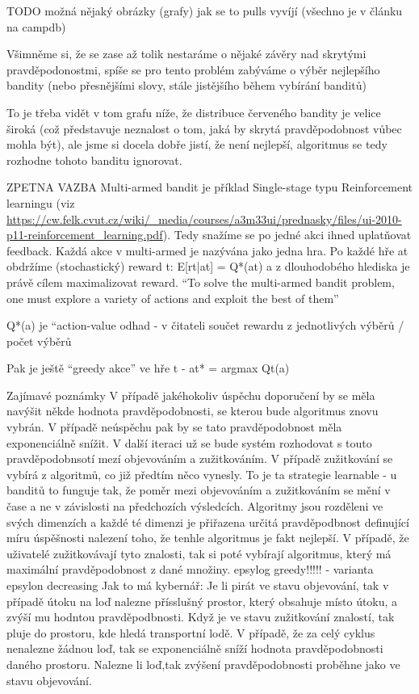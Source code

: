 \documentclass[thesis=M,czech]{FITthesis}[2014/05/07]
\begin{document}
TODO možná nějaký obrázky (grafy) jak se to pulls vyvíjí (všechno je v článku na campdb)

Všimněme si, že se zase až tolik nestaráme o nějaké závěry nad skrytými pravděpodonostmi, spíše se pro tento problém zabýváme o výběr nejlepšího bandity (nebo přesnějšími slovy, stále jistějšího během vybírání banditů)

To je třeba vidět v tom grafu níže, že distribuce červeného bandity je velice široká (což představuje neznalost o tom, jaká by skrytá pravděpodobnost vůbec mohla být), ale jsme si docela dobře jistí, že není nejlepší, algoritmus se tedy rozhodne tohoto banditu ignorovat.

ZPETNA VAZBA
Multi-armed bandit je příklad Single-stage typu Reinforcement learningu (viz \url{https://cw.felk.cvut.cz/wiki/_media/courses/a3m33ui/prednasky/files/ui-2010-p11-reinforcement_learning.pdf}). Tedy snažíme se po jedné akci ihned uplatňovat feedback. Každá akce v multi-armed je nazývána jako jedna hra. Po každé hře at obdržíme (stochastický) reward t:
E[rt|at] = Q*(at) a z dlouhodobého hlediska je právě cílem maximalizovat reward.
“To solve the multi-armed bandit problem, one must explore a variety of
actions and exploit the best of them”

Q*(a) je “action-value odhad - v čitateli součet rewardu z jednotlivých výběrů / počet výběrů

Pak je ještě “greedy akce” ve hře t - at* = argmax Qt(a) 

Zajímavé poznámky
V případě jakéhokoliv úspěchu doporučení by se měla navýšit někde hodnota pravděpodobnosti, se kterou bude algoritmus znovu vybrán. V případě neúspěchu pak by se tato pravděpodobnost měla exponenciálně snížit. V další iteraci už se bude systém rozhodovat s touto pravděpodobnsotí mezí objevováním a zužitkováním. V případě zužitkování se vybírá z algoritmů, co již předtím něco vynesly. To je ta strategie learnable - u banditů to funguje tak, že poměr mezi objevováním a zužitkováním se mění v čase a ne v závislosti na předchozích výsledcích. Algoritmy jsou rozděleni ve svých dimenzích a každé té dimenzi je přiřazena určitá pravděpodbnost definující míru úspěšnosti nalezení toho, že tenhle algoritmus je fakt nejlepší. V případě, že uživatelé zužitkovávají tyto znalosti, tak si poté vybírají algoritmus, který má maximální pravděpodobnost z dané množiny. 
epsylog greedy!!!!! - varianta  epsylon decreasing
Jak to má kybernář: Je li pirát ve stavu objevování, tak v případě útoku na loď nalezne přísslušný prostor, který obsahuje místo útoku, a zvýší mu hodntou pravděpodbnosti. Když je ve stavu zužitkování znalostí, tak pluje do prostoru, kde hledá transportní lodě. V případě, že za celý cyklus nenalezne žádnou loď, tak se exponenciálně sníží hodnota pravděpodobnosti daného prostoru. Nalezne li loď,tak zvýšení pravděpodobnosti proběhne jako ve stavu objevování. 
\end{document}
